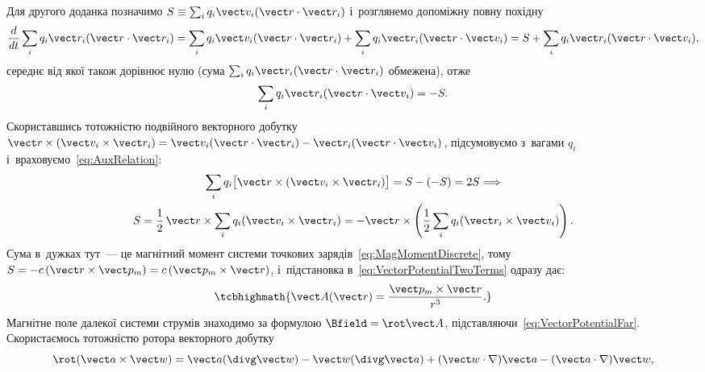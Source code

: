 Для другого доданка позначимо $S \equiv \sum_i q_i\vect v_i(\vect r\cdot\vect r_i)$
і~розглянемо допоміжну повну похідну
\begin{equation*}
	\frac{d}{dt}\sum_i q_i\vect r_i(\vect r\cdot\vect r_i)
	= \sum_i q_i\vect v_i(\vect r\cdot\vect r_i) + \sum_i q_i\vect r_i(\vect r\cdot\vect v_i)
	= S + \sum_i q_i\vect r_i(\vect r\cdot\vect v_i),
\end{equation*}
середнє від якої також дорівнює нулю (сума $\sum_i q_i\vect r_i(\vect r\cdot\vect r_i)$
обмежена), отже
\begin{equation}\label{eq:AuxRelation}
	\sum_i q_i\vect r_i(\vect r\cdot\vect v_i) = -S.
\end{equation}
Скориставшись тотожністю подвійного векторного добутку $\vect r\times(\vect v_i\times\vect
	r_i) = \vect v_i(\vect r\cdot\vect r_i) - \vect r_i(\vect r\cdot\vect v_i)$, підсумовуємо
з~вагами $q_i$ і~враховуємо~\eqref{eq:AuxRelation}:
\begin{multline}
	\sum_i q_i\bigl[\vect r\times(\vect v_i\times\vect r_i)\bigr] = S - (-S) = 2S
	\Longrightarrow\\
	S = \frac12\,\vect r\times\sum_i q_i(\vect v_i\times\vect r_i) = -\vect r\times\left(\frac12\sum_i q_i(\vect r_i\times\vect v_i)\right).
\end{multline}
Сума в~дужках тут~--- це магнітний момент системи точкових
зарядів~\eqref{eq:MagMomentDiscrete}, тому $S = -c\,(\vect r\times\vect p_m) = c\,(\vect
	p_m\times\vect r)$, і~підстановка в~\eqref{eq:VectorPotentialTwoTerms} одразу дає:
\begin{equation}\label{eq:VectorPotentialFar}
	\tcbhighmath{
		\vect A(\vect r) = \frac{\vect p_m\times\vect r}{r^3}.
	}
\end{equation}
Магнітне поле далекої системи струмів знаходимо за формулою $\Bfield = \rot\vect A$,
підставляючи~\eqref{eq:VectorPotentialFar}. Скористаємось тотожністю ротора векторного
добутку
\begin{equation*}
	\rot(\vect a\times\vect w) = \vect a(\divg\vect w) - \vect w(\divg\vect a) + (\vect w\cdot\nabla)\vect a - (\vect a\cdot\nabla)\vect w,
\end{equation*}
